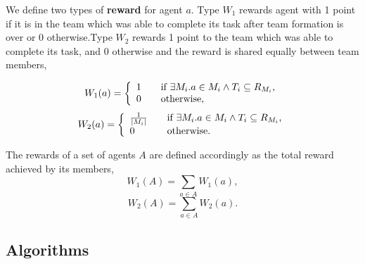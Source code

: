 \documentclass{llncs}
\begin{document}
\begin{definition}
We define two types of \textbf{reward} for agent $a$. Type $W_1$ rewards agent with 1 point if it is in the team which was able to complete its task after team formation is over or 0 otherwise.Type $W_2$ rewards 1 point to the team which was able to complete its task, and 0 otherwise and the reward is shared equally between team members,

\begin{equation}
W_1(a) = \left\{
  \begin{array}{l l}
    1 & \quad \text{if $\exists M_i . a \in M_i \wedge T_i \subseteq R_{M_i}$,}\\
    0 & \quad \text{otherwise,}\\
  \end{array} \right.
\label{eq:w1agent}
\end{equation}
\begin{equation}
W_2(a) = \left\{
  \begin{array}{l l}
    \frac{1}{|M_i|} & \quad \text{if $\exists M_i . a \in M_i \wedge T_i \subseteq R_{M_i}$,}\\
    0 & \quad \text{otherwise.}\\
  \end{array} \right.
\label{eq:w2agent}
\end{equation}

The rewards of a set of agents $A$ are defined accordingly as the total reward achieved by its members,
\begin{equation}
 W_1(A) = \sum_{a \in A} W_1(a),
\label{eq:w1organisation}
\end{equation}
\begin{equation}
 W_2(A) = \sum_{a \in A} W_2(a).
\label{eq:w2organisation}
\end{equation}

\end{definition}

\subsection{Algorithms}
\end{document}
